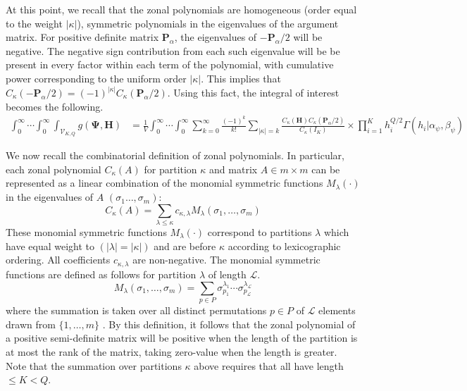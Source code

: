 \documentclass[12pt]{article}
\begin{document}
At this point, we recall that the zonal polynomials are homogeneous (order equal to the weight $|\kappa|$), symmetric polynomials in the eigenvalues of the argument matrix. For positive definite matrix $\mathbf{P}_\alpha$, the eigenvalues of $-\mathbf{P}_\alpha/2$ will be negative. The negative sign contribution from each such eigenvalue will be be present in every factor within each term of the polynomial, with cumulative power corresponding to the uniform order $|\kappa|$. This implies that $C_\kappa(-\mathbf{P}_\alpha/2) = (-1)^{|\kappa|}C_\kappa(\mathbf{P}_\alpha/2)$. Using this fact, the integral of interest becomes the following.
\begin{align*}
    \int_0^{\infty} \cdots \int_0^\infty \int_{\mathcal{V}_{K,Q}} g(\boldsymbol{\Psi}, \mathbf{H}) & = \frac{1}{V}\int_0^\infty \cdots \int_0^\infty \sum_{k = 0}^\infty \frac{(-1)^k}{k!} \sum_{|\kappa| = k} \frac{C_\kappa(\mathbf{H})C_\kappa(\mathbf{P}_\alpha/2)}{C_\kappa(I_K)} \times \prod_{i = 1}^K h_i^{Q/2} \Gamma(h_i| \alpha_\psi, \beta_\psi)
\end{align*}

We now recall the combinatorial definition of zonal polynomials. In particular, each zonal polynomial $C_\kappa(A)$ for partition $\kappa$ and matrix $A \in m\times m$ can be represented as a linear combination of the monomial symmetric functions $M_\lambda(\cdot)$ in the eigenvalues of $A$ $(\sigma_1 \ldots, \sigma_m)$:  
$$C_\kappa(A) = \sum_{\lambda \leq \kappa} c_{ \kappa, \lambda} M_\lambda(\sigma_1,\ldots, \sigma_m)$$
\noindent These monomial symmetric functions $M_\lambda(\cdot)$ correspond to partitions $\lambda$ which have equal weight to $(|\lambda| = |\kappa|)$ and are before $\kappa$ according to lexicographic ordering. All coefficients $c_{\kappa, \lambda}$ are non-negative. The monomial symmetric functions are defined as follows for partition $\lambda$ of length $\mathcal{L}$.
$$M_\lambda(\sigma_1, \ldots, \sigma_m) = \sum_{p \in P}\sigma_{p_1}^{\lambda_1}\cdots \sigma_{p_\mathcal{L}}^{\lambda_{\mathcal{L}}}$$
\noindent where the summation is taken over all distinct permutations $p \in P$ of $\mathcal{L}$ elements drawn from $\{1,\ldots, m\}$ \citep{bagyan_complete_2024}. By this definition, it follows that the zonal polynomial of a positive semi-definite matrix will be positive when the length of the partition is at most the rank of the matrix, taking zero-value when the length is greater. Note that the summation over partitions $\kappa$ above requires that all have length $\leq K < Q$.
\end{document}
